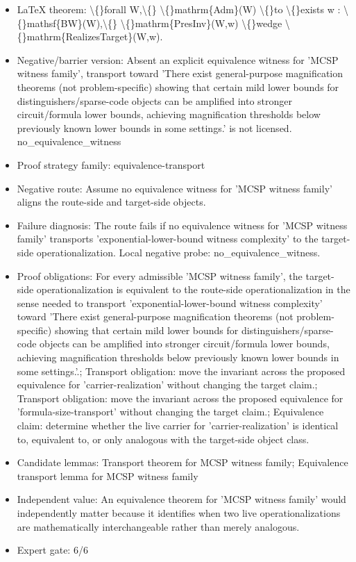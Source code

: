 \documentclass[11pt]{article}
\begin{document}
\begin{itemize}
\item LaTeX theorem: \textbackslash\{\}forall W,\textbackslash\{\} \textbackslash\{\}mathrm\{Adm\}(W) \textbackslash\{\}to \textbackslash\{\}exists w : \textbackslash\{\}mathsf\{BW\}(W),\textbackslash\{\} \textbackslash\{\}mathrm\{PresInv\}(W,w) \textbackslash\{\}wedge \textbackslash\{\}mathrm\{RealizesTarget\}(W,w).
\item Negative/barrier version: Absent an explicit equivalence witness for 'MCSP witness family', transport toward 'There exist general-purpose magnification theorems (not problem-specific) showing that certain mild lower bounds for distinguishers/sparse-code objects can be amplified into stronger circuit/formula lower bounds, achieving magnification thresholds below previously known lower bounds in some settings.' is not licensed. no\_equivalence\_witness
\item Proof strategy family: equivalence-transport
\item Negative route: Assume no equivalence witness for 'MCSP witness family' aligns the route-side and target-side objects.
\item Failure diagnosis: The route fails if no equivalence witness for 'MCSP witness family' transports 'exponential-lower-bound witness complexity' to the target-side operationalization. Local negative probe: no\_equivalence\_witness.
\item Proof obligations: For every admissible 'MCSP witness family', the target-side operationalization is equivalent to the route-side operationalization in the sense needed to transport 'exponential-lower-bound witness complexity' toward 'There exist general-purpose magnification theorems (not problem-specific) showing that certain mild lower bounds for distinguishers/sparse-code objects can be amplified into stronger circuit/formula lower bounds, achieving magnification thresholds below previously known lower bounds in some settings.'.; Transport obligation: move the invariant across the proposed equivalence for 'carrier-realization' without changing the target claim.; Transport obligation: move the invariant across the proposed equivalence for 'formula-size-transport' without changing the target claim.; Equivalence claim: determine whether the live carrier for 'carrier-realization' is identical to, equivalent to, or only analogous with the target-side object class.
\item Candidate lemmas: Transport theorem for MCSP witness family; Equivalence transport lemma for MCSP witness family
\item Independent value: An equivalence theorem for 'MCSP witness family' would independently matter because it identifies when two live operationalizations are mathematically interchangeable rather than merely analogous.
\item Expert gate: 6/6
\end{itemize}
\end{document}
